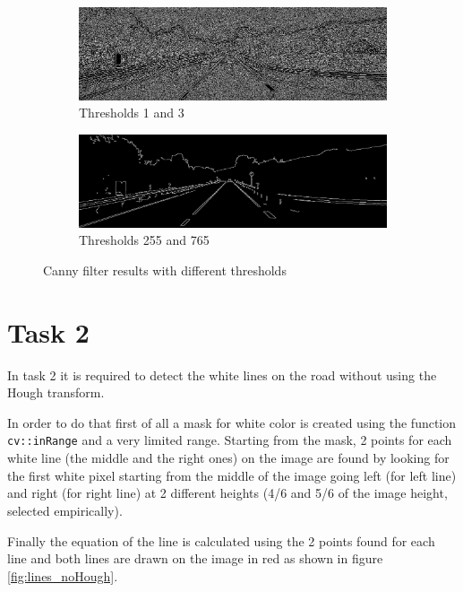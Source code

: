 \documentclass{article}
\begin{document}
\begin{figure}[H]
	\centering
	\begin{subfigure}{0.49\textwidth}
		\includegraphics[width=\textwidth]{street_scene_thresholdMin1Max3.png}
		\caption{Thresholds 1 and 3}
	\end{subfigure}
	\hfill
	\begin{subfigure}{0.49\textwidth}
		\includegraphics[width=\textwidth]{street_scene_thresholdMin255Max765.png}
		\caption{Thresholds 255 and 765}
	\end{subfigure}
	\caption{Canny filter results with different thresholds}
	\label{fig:canny_results}
\end{figure}


\section*{Task 2}
In task 2 it is required to detect the white lines on the road without using the Hough transform.

In order to do that first of all a mask for white color is created using the function \texttt{cv::inRange} and a very limited range.
Starting from the mask, 2 points for each white line (the middle and the right ones) on the image are found by looking for the first white pixel starting from the middle of the image going left (for left line) and right (for right line) at 2 different heights (4/6 and 5/6 of the image height, selected empirically).

Finally the equation of the line is calculated using the 2 points found for each line and both lines are drawn on the image in red as shown in figure \ref{fig:lines_noHough}.
\end{document}
